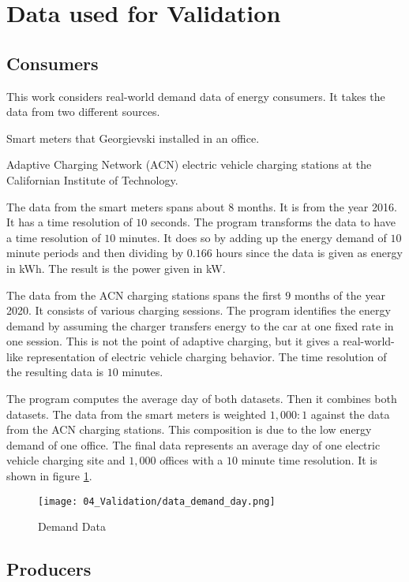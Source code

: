 \section{Data used for Validation}
\label{validation:data}

\subsection{Consumers}

This work considers real-world demand data of energy consumers.
It takes the data from two different sources.
\begin{enumerate*}
  \item Smart meters that Georgievski \citeauthor{Georgievski2012} installed in an office. \cite{Georgievski2012}
  \item Adaptive Charging Network (ACN) electric vehicle charging stations at the Californian Institute of Technology. \cite{Lee2019, ACNCaltech2020}
\end{enumerate*}

The data from the smart meters spans about $8$ months.
It is from the year 2016.
It has a time resolution of $10$ seconds.
The program transforms the data to have a time resolution of $10$ minutes.
It does so by adding up the energy demand of $10$ minute periods and then dividing by $0.166$ hours since the data is given as energy in kWh.
The result is the power given in kW.

The data from the ACN charging stations spans the first $9$ months of the year 2020.
It consists of various charging sessions.
The program identifies the energy demand by assuming the charger transfers energy to the car at one fixed rate in one session.
This is not the point of adaptive charging, but it gives a real-world-like representation of electric vehicle charging behavior.
The time resolution of the resulting data is $10$ minutes.

The program computes the average day of both datasets.
Then it combines both datasets.
The data from the smart meters is weighted $1, 000 : 1$ against the data from the ACN charging stations.
This composition is due to the low energy demand of one office.
The final data represents an average day of one electric vehicle charging site and $1, 000$ offices with a $10$ minute time resolution.
It is shown in figure \ref{figure:data.demand.day}.

\begin{figure}
  \centering
  \texttt{[image: 04\_Validation/data\_demand\_day.png]}
  \caption{Demand Data}
  \label{figure:data.demand.day}
\end{figure}

\subsection{Producers}

